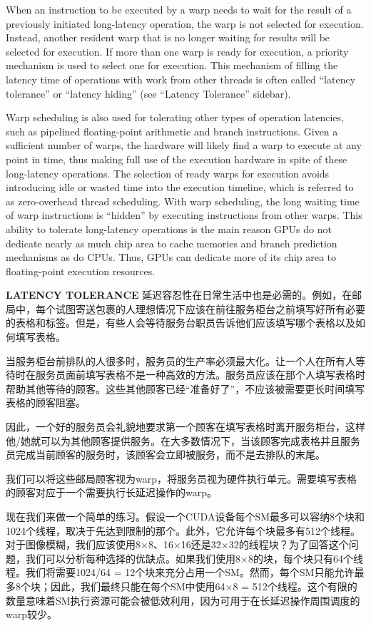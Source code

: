 \documentclass[11pt]{ctexart}
\begin{document}
When an instruction to be executed by a warp needs to wait for the result of a previously initiated long-latency operation, the warp is not selected for execution.
Instead, another resident warp that is no longer waiting for results will be selected for execution. If more than one warp is ready for execution, a priority mechanism is used to select one for execution. This mechanism of filling the latency time of operations with work from other threads is often called “latency tolerance” or “latency hiding” (see “Latency Tolerance” sidebar).

Warp scheduling is also used for tolerating other types of operation latencies, such as pipelined floating-point arithmetic and branch instructions. Given a sufficient number of warps, the hardware will likely find a warp to execute at any point in time, thus making full use of the execution hardware in spite of these long-latency operations. The selection of ready warps for execution avoids introducing idle or wasted time into the execution timeline, which is referred to as zero-overhead thread
scheduling. With warp scheduling, the long waiting time of warp instructions is “hidden” by executing instructions from other warps. This ability to tolerate long-latency operations is the main reason GPUs do not dedicate nearly as much chip area to cache memories and branch prediction mechanisms as do CPUs. Thus, GPUs can dedicate more of its chip area to floating-point execution resources.

\textbf{LATENCY TOLERANCE} 延迟容忍性在日常生活中也是必需的。例如，在邮局中，每个试图寄送包裹的人理想情况下应该在前往服务柜台之前填写好所有必要的表格和标签。但是，有些人会等待服务台职员告诉他们应该填写哪个表格以及如何填写表格。

当服务柜台前排队的人很多时，服务员的生产率必须最大化。让一个人在所有人等待时在服务员面前填写表格不是一种高效的方法。服务员应该在那个人填写表格时帮助其他等待的顾客。这些其他顾客已经“准备好了”，不应该被需要更长时间填写表格的顾客阻塞。

因此，一个好的服务员会礼貌地要求第一个顾客在填写表格时离开服务柜台，这样他/她就可以为其他顾客提供服务。在大多数情况下，当该顾客完成表格并且服务员完成当前顾客的服务时，该顾客会立即被服务，而不是去排队的末尾。

我们可以将这些邮局顾客视为warp，将服务员视为硬件执行单元。需要填写表格的顾客对应于一个需要执行长延迟操作的warp。


现在我们来做一个简单的练习。假设一个CUDA设备每个SM最多可以容纳8个块和1024个线程，取决于先达到限制的那个。此外，它允许每个块最多有512个线程。对于图像模糊，我们应该使用8×8、16×16还是32×32的线程块？为了回答这个问题，我们可以分析每种选择的优缺点。如果我们使用8×8的块，每个块只有64个线程。我们将需要1024/64 = 12个块来充分占用一个SM。然而，每个SM只能允许最多8个块；因此，我们最终只能在每个SM中使用64×8 = 512个线程。这个有限的数量意味着SM执行资源可能会被低效利用，因为可用于在长延迟操作周围调度的warp较少。
\end{document}
